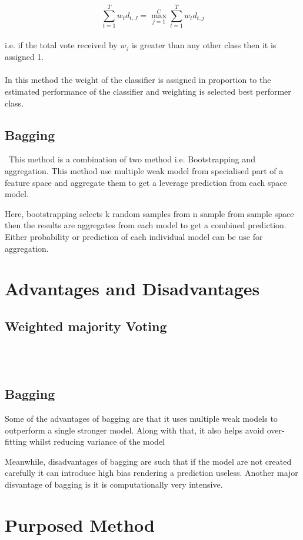 \documentclass{article}
\begin{document}
$$\displaystyle\sum_{t=1}^{T}w_{t}d_{t,J}=\displaystyle\mathop{\max}_{j=1}^{C}\displaystyle\sum_{t=1}^{T}w_{t}d_{t,j}$$
\\
i.e. if the total vote received by $w_j$ is greater than any other class then it is assigned 1.\\
\\
In this method the weight of the classifier is assigned in proportion to the estimated performance of the classifier and weighting is selected best performer class. 

\subsection{Bagging}\
This method is a combination of two method i.e. Bootstrapping and aggregation. This method use multiple weak model from specialised part of a feature space and aggregate them to get a leverage prediction from each space model.

Here, bootstrapping selects k random samples from n sample from sample space then the results are aggregates from each model to get a combined prediction. Either probability or prediction of each individual model can be use for aggregation.    

\section{Advantages and Disadvantages}
\subsection{Weighted majority Voting}\label{SEC:Enviro}
\\
\\

\subsection{Bagging}\label{sec:Social}
Some of the advantages of bagging are that it uses multiple weak models to outperform a single stronger model. Along with that, it also helps avoid over-fitting whilst reducing variance of the model 

Meanwhile, disadvantages of bagging are such that if the model are not created carefully it can introduce high bias rendering a prediction useless. Another major disvantage of bagging is it is computationally very intensive. 

\section{Purposed Method}
\end{document}
